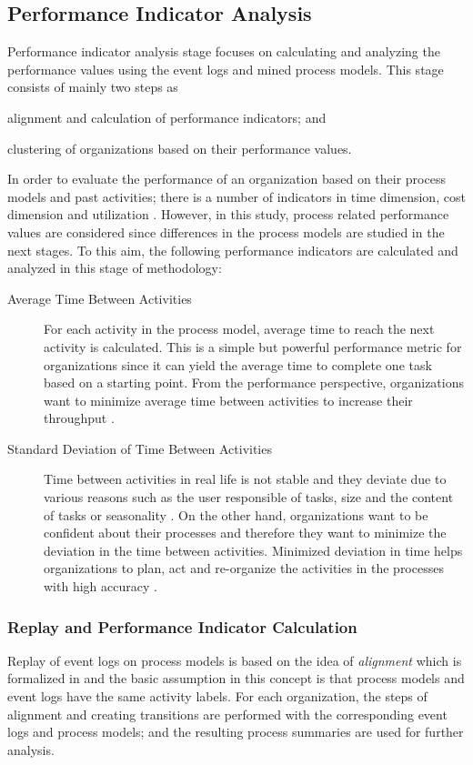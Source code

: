 \subsection{Performance Indicator Analysis}
\label{subsec:performance-indicator-analysis}
Performance indicator analysis stage focuses on calculating and analyzing the performance values using the event logs and mined process models. This stage consists of mainly two steps as 
\begin{inparaenum}
\item alignment and calculation of performance indicators; and
\item clustering of organizations based on their performance values.
\end{inparaenum}
In order to evaluate the performance of an organization based on their process models and past activities; there is a number of indicators in time dimension, cost dimension and utilization \cite{van2011process}. However, in this study, process related performance values are considered since differences in the process models are studied in the next stages. To this aim, the following performance indicators are calculated and analyzed in this stage of methodology:
\begin{description}
	\item[Average Time Between Activities] For each activity in the process model, average time to reach the next activity is calculated. This is a simple but powerful performance metric for organizations since it can yield the average time to complete one task based on a starting point. From the performance perspective, organizations want to minimize average time between activities to increase their throughput \cite{van2012replaying}.
	\item[Standard Deviation of Time Between Activities] Time between activities in real life is not stable and they deviate due to various reasons such as the user responsible of tasks, size and the content of tasks or seasonality \cite{van2011process}. On the other hand, organizations want to be confident about their processes and therefore they want to minimize the deviation in the time between activities. Minimized deviation in time helps organizations to plan, act and re-organize the activities in the processes with high accuracy \cite{van2012replaying}. 
\end{description}

\subsubsection{Replay and Performance Indicator Calculation}
\label{subsubsec:replay-and-performance-summary}
Replay of event logs on process models is based on the idea of \textit{alignment} which is formalized in \cite{van2012replaying} and the basic assumption in this concept is that process models and event logs have the same activity labels. For each organization, the steps of alignment and creating transitions are performed with the corresponding event logs and process models; and the resulting process summaries are used for further analysis.

